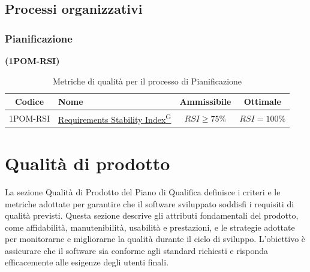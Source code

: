 \documentclass{article}
\begin{document}
\subsection{Processi organizzativi}
\subsubsection{Pianificazione} %
\textbf{(1POM-RSI)}
\begin{table}[H]
    \centering
    \renewcommand{\arraystretch}{1.5} %
    \begin{tabular}{|c|l|c|c|}
        \hline
        \textbf{Codice} & \textbf{Nome} & \textbf{Ammissibile} & \textbf{Ottimale} \\
        \hline
        1POM-RSI & \href{https://code7crusaders.github.io/docs/PB/documentazione_interna/glossario.html#requirements-stability-index}{Requirements Stability Index\textsuperscript{G}} & $RSI \geq 75\%$ & $RSI = 100\%$ \\
        \hline
    \end{tabular}
    \label{tab:pianificazione}
    \caption{Metriche di qualità per il processo di Pianificazione}
\end{table}
\newpage

\section{Qualità di prodotto}
La sezione Qualità di Prodotto del Piano di Qualifica definisce i criteri e le metriche adottate per garantire che il software sviluppato soddisfi i requisiti di qualità previsti. Questa sezione descrive gli attributi fondamentali del prodotto, come affidabilità, manutenibilità, usabilità e prestazioni, e le strategie adottate per monitorarne e migliorarne la qualità durante il ciclo di sviluppo. L'obiettivo è assicurare che il software sia conforme agli standard richiesti e risponda efficacemente alle esigenze degli utenti finali.
    
\end{document}
